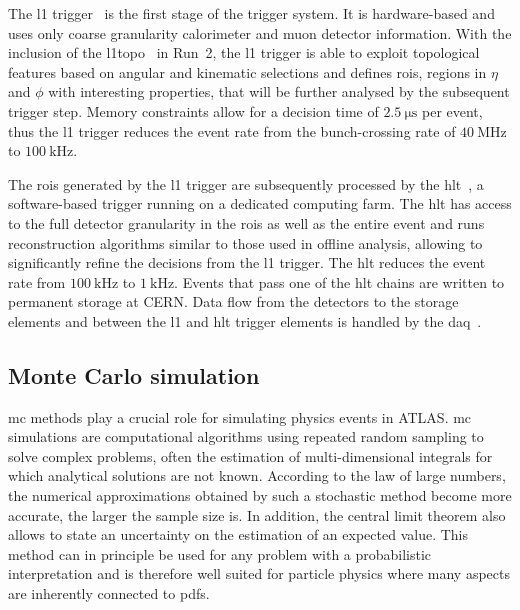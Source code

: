 The \gls{l1} trigger~\cite{CERN-LHCC-98-014} is the first stage of the trigger system. It is hardware-based and uses only coarse granularity calorimeter and muon detector information. With the inclusion of the \gls{l1topo}~\cite{Aad:2020wji} in Run~2, the \gls{l1} trigger is able to exploit topological features based on angular and kinematic selections and defines \gls{rois}, \ie regions in $\eta$ and $\phi$ with interesting properties, that will be further analysed by the subsequent trigger step. Memory constraints allow for a decision time of $\SI{2.5}{\micro\second}$ per event, thus the \gls{l1} trigger reduces the event rate from the bunch-crossing rate of $\SI{40}{\MHz}$ to $\SI{100}{\kHz}$. 

The \gls{rois} generated by the \gls{l1} trigger are subsequently processed by the \gls{hlt}~\cite{Jenni:616089}, a software-based trigger running on a dedicated computing farm. The \gls{hlt} has access to the full detector granularity in the \gls{rois} as well as the entire event and runs reconstruction algorithms similar to those used in offline analysis, allowing to significantly refine the decisions from the \gls{l1} trigger. The \gls{hlt} reduces the event rate from $\SI{100}{\kHz}$ to $\SI{1}{\kHz}$. Events that pass one of the \gls{hlt} chains are written to permanent storage at CERN. Data flow from the detectors to the storage elements and between the \gls{l1} and \gls{hlt} trigger elements is handled by the \gls{daq}~\cite{Jenni:616089}.


\subsection{Monte Carlo simulation}\label{sec:mc_simulation}

\gls{mc} methods play a crucial role for simulating physics events in ATLAS. \gls{mc} simulations are computational algorithms using repeated random sampling to solve complex problems, often the estimation of multi-dimensional integrals for which analytical solutions are not known. According to the law of large numbers, the numerical approximations obtained by such a stochastic method become more accurate, the larger the sample size is. In addition, the central limit theorem also allows to state an uncertainty on the estimation of an expected value.  This method can in principle be used for any problem with a probabilistic interpretation and is therefore well suited for particle physics where many aspects are inherently connected to \glspl{pdf}. 

